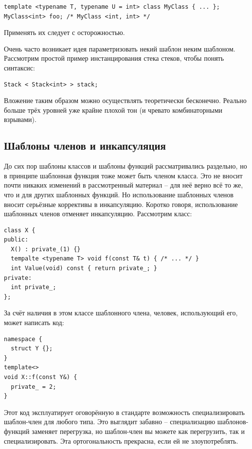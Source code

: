 \documentclass[a4paper,12pt,oneside]{article}
\begin{document}
\begin{lstlisting}
template <typename T, typename U = int> class MyClass { ... };
MyClass<int> foo; /* MyClass <int, int> */
\end{lstlisting}

Применять их следует с осторожностью.

Очень часто возникает идея параметризовать некий шаблон неким шаблоном. Рассмотрим простой пример инстанцирования стека стеков, чтобы понять синтаксис:

\begin{lstlisting}
Stack < Stack<int> > stack;
\end{lstlisting}

Вложение таким образом можно осуществлять теоретически бесконечно. Реально больше трёх уровней уже крайне плохой тон (и чревато комбинаторными взрывами).

\subsection{Шаблоны членов и инкапсуляция}

До сих пор шаблоны классов и шаблоны функций рассматривались раздельно, но в принципе шаблонная функция тоже может быть членом класса. Это не вносит почти никаких изменений в рассмотренный материал -- для неё верно всё то же, что и для других шаблонных функций. Но использование шаблонных членов вносит серьёзные коррективы в инкапсуляцию. Коротко говоря, использование шаблонных членов отменяет инкапсуляцию. Рассмотрим класс:

\begin{lstlisting}
class X {
public:
  X() : private_(1) {}
  tempalte <typename T> void f(const T& t) { /* ... */ }
  int Value(void) const { return private_; }
private:
  int private_;  
};
\end{lstlisting}

За счёт наличия в этом классе шаблонного члена, человек, использующий его, может написать код:

\begin{lstlisting}
namespace {
  struct Y {};
}
template<>
void X::f(const Y&) {
  private_ = 2;
}
\end{lstlisting}

Этот код эксплуатирует оговорённую в стандарте возможность специализировать шаблон-член для любого типа. Это выглядит забавно -- специализацию шаблонов-функций заменяет перегрузка, но шаблон-член вы можете как перегрузить, так и специализировать. Эта ортогональность прекрасна, если ей не злоупотреблять.
\end{document}
